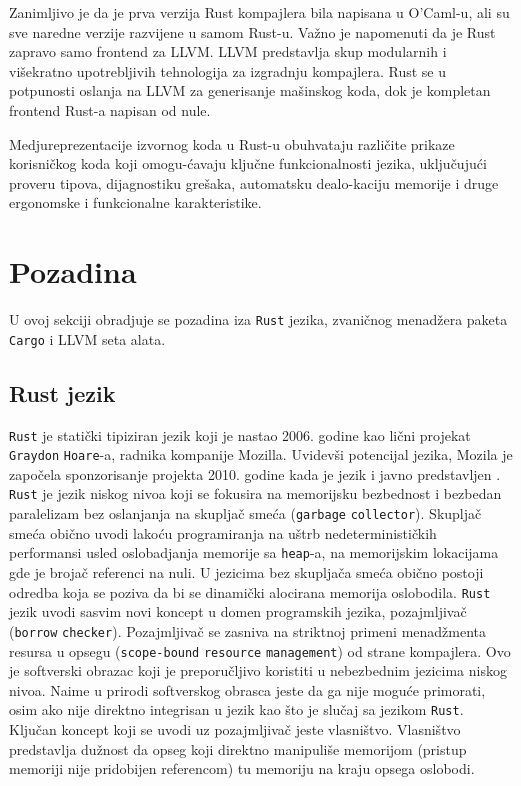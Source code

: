 Zanimljivo je da je prva verzija Rust kompajlera bila napisana u O'Caml-u, ali su sve naredne verzije razvijene u samom Rust-u. 
Važno je napomenuti da je Rust zapravo samo frontend za LLVM. LLVM predstavlja skup modularnih i višekratno upotrebljivih tehnologija za izgradnju kompajlera. 
Rust se u potpunosti oslanja na LLVM za generisanje mašinskog koda, dok je kompletan frontend Rust-a napisan od nule.

Medjureprezentacije izvornog koda u Rust-u obuhvataju različite prikaze korisničkog koda koji omogu\hyp{}ćavaju ključne funkcionalnosti jezika, 
uključujući proveru tipova, dijagnostiku grešaka, automatsku dealo\hyp{}kaciju memorije i druge ergonomske i funkcionalne karakteristike.

\newpage

\section{Pozadina}

U ovoj sekciji obradjuje se pozadina iza \verb|Rust| jezika, zvaničnog menadžera paketa \verb|Cargo| i 
LLVM seta alata.

\subsection{Rust jezik}

\verb|Rust| je statički tipiziran jezik koji je nastao 2006. godine kao lični projekat \verb|Graydon| \verb|Hoare|-a, radnika kompanije 
Mozilla. Uvidevši potencijal jezika, Mozila je započela sponzorisanje projekta 2010. godine kada je jezik i javno 
predstavljen \cite{rust-language}. \verb|Rust| je jezik niskog nivoa koji se fokusira na memorijsku bezbednost
i bezbedan paralelizam bez oslanjanja na skupljač smeća (\verb|garbage| \verb|collector|). Skupljač smeća 
obično uvodi lakoću programiranja na uštrb nedeterminističkih performansi usled oslobadjanja memorije 
sa \verb|heap|-a, na memorijskim lokacijama gde je brojač referenci na nuli. U jezicima bez skupljača 
smeća obično postoji odredba koja se poziva da bi se dinamički alocirana memorija oslobodila. \verb|Rust|
jezik uvodi sasvim novi koncept u domen programskih jezika, pozajmljivač (\verb|borrow| \verb|checker|).
Pozajmljivač se zasniva na striktnoj primeni menadžmenta resursa u opsegu (\verb|scope-bound| \verb|resource| \verb|management|) 
od strane kompajlera. Ovo je softverski obrazac koji je preporučljivo koristiti u nebezbednim jezicima 
niskog nivoa. Naime u prirodi softverskog obrasca jeste da ga nije moguće primorati, osim ako nije direktno
integrisan u jezik kao što je slučaj sa jezikom \verb|Rust|. Ključan koncept koji se uvodi uz pozajmljivač 
jeste vlasništvo. Vlasništvo predstavlja dužnost da opseg koji direktno manipuliše memorijom (pristup memoriji nije 
pridobijen referencom) tu memoriju na kraju opsega oslobodi. 

